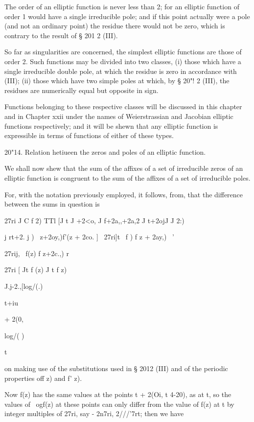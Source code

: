 The order of an elliptic function is never less than 2; for an
elliptic function of order 1 would have a single irreducible pole;
and if this point actually were a pole (and not an ordinary point) the
residue there would not be zero, which is contrary to the result of §
201 2 (III).

So far as singularities are concerned, the simplest elliptic functions
are those of order 2. Such functions may be divided into two classes,
(i) those which have a single irreducible double pole, at which the
residue is zero in accordance with (III); (ii) those which
have two simple poles at which, by § 20"! 2 (III), the residues are
numerically equal but opposite in sign.

Functions belonging to these respective classes will be discussed in
this chapter and in Chapter xxii under the names of Weierstrassian and
Jacobian elliptic functions respectively; and it will be shewn that
any elliptic function is expressible in terms of functions of either
of these types.

%
%

20"14. Relation hetiueen the zeros and poles of an elliptic function.

We shall now shew that the sum of the affixes of a set of irreducible
zeros of an elliptic function is congruent to the sum of the affixes
of a set of irreducible poles.

For, with the notation previously employed, it follows, from,
that the difference between the sums in question is

27ri J C f 2) TTl [J t J +2<o, J f+2a,,+2a,2 J t+2ojJ J 2:)

  j rt+2. j ) \ z+2oy,)f'(z + 2co. ] ~27ri]t \ f ) f z + 2ay,) \ '

27rij, \ f(z) f z+2c.,) r

27ri [ Jt f (z) J t f z)

J.j-2.,[log/(.)

t+iu

+ 2(0,

log/( )

t

on making use of the substitutions used in § 2012 (III) and of the
periodic properties off z) and f' z).

Now f(z) has the same values at the points t + 2(Oi, t 4-20), as at t,
so the values of \ ogf(z) at these points can only differ from the
value of f(z) at t by integer multiples of 27ri, say - 2n7ri,
2///'7rt; then we have

